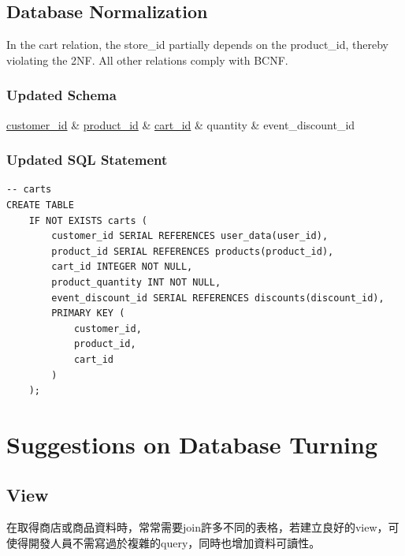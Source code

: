 \documentclass[a4paper, 12pt]{article}
\begin{document}
\subsection{Database Normalization}

    In the cart relation, the store\_id partially depends on the product\_id, thereby violating the 2NF. All other relations comply with BCNF.

\subsubsection{Updated Schema}
\newline
\begin{dependency}
    \begin{deptext}[TxtBook] %
        \underline{customer_id} \& \underline{product_id} \& \underline{cart_id} \& quantity \& event_discount_id \\
    \end{deptext}
\end{dependency}

\subsubsection{Updated SQL Statement}

\begin{lstlisting}
-- carts
CREATE TABLE
    IF NOT EXISTS carts (
        customer_id SERIAL REFERENCES user_data(user_id),
        product_id SERIAL REFERENCES products(product_id),
        cart_id INTEGER NOT NULL,
        product_quantity INT NOT NULL,
        event_discount_id SERIAL REFERENCES discounts(discount_id),
        PRIMARY KEY (
            customer_id,
            product_id,
            cart_id
        )
    );
\end{lstlisting}


\newpage

\section{Suggestions on Database Turning}

\subsection{View}
    在取得商店或商品資料時，常常需要join許多不同的表格，若建立良好的view，可使得開發人員不需寫過於複雜的query，同時也增加資料可讀性。
\end{document}
